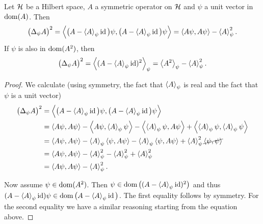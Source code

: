 \begin{lemma}
Let $\mathcal{H}$ be a Hilbert space, $A$ a symmetric operator on $\mathcal{H}$ and $\psi$ a unit vector in $\operatorname{dom}(A)$. Then
\[ \big(\var_\psi A\big)^2 = \inner{\big(A - \expval{A}_\psi\id\big)\psi, \big(A - \expval{A}_\psi\id\big)\psi} = \inner{A\psi,A\psi} - \expval{A}_\psi^2. \]
If $\psi$ is also in $\operatorname{dom}(A^2)$, then
\[ \big(\Delta_\psi A\big)^2 = \left\langle (A - \left\langle A \right\rangle_\psi\operatorname{id})^2 \right\rangle_\psi = \left\langle A^2 \right\rangle_\psi - \left\langle A \right\rangle_\psi^2. \]
\end{lemma}
\begin{proof}
We calculate (using symmetry, the fact that $\left\langle A \right\rangle_\psi$ is real and the fact that $\psi$ is a unit vector)
\begin{align*}
\big(\var_\psi A\big)^2 &= \inner{\big(A - \expval{A}_\psi\id\big)\psi, \big(A - \expval{A}_\psi\id\big)\psi} \\
&= \inner{A\psi,A\psi} - \inner{A\psi, \expval{A}_\psi\psi} - \inner{\expval{A}_\psi\psi, A\psi} + \inner{\expval{A}_\psi\psi, \expval{A}_\psi\psi} \\
&= \inner{A\psi,A\psi} - \expval{A}_\psi\inner{\psi, A\psi} - \expval{A}_\psi\inner{\psi, A\psi} + \expval{A}_\psi^2\cancel{\inner{\psi, \psi}} \\
&= \inner{A\psi,A\psi} - \expval{A}_\psi^2 - \expval{A}_\psi^2 + \expval{A}_\psi^2 \\
&= \inner{A\psi,A\psi} - \expval{A}_\psi^2.
\end{align*}

Now assume $\psi\in \operatorname{dom}(A^2)$. Then $\psi\in \operatorname{dom}\big((A- \left\langle A \right\rangle_\psi\operatorname{id})^2\big)$ and thus $(A- \left\langle A \right\rangle_\psi\operatorname{id})\psi \in \operatorname{dom}\big(A- \left\langle A \right\rangle_\psi\operatorname{id}\big)$. The first equality follows by symmetry. For the second equality we have a similar reasoning starting from the equation above.
\end{proof}

